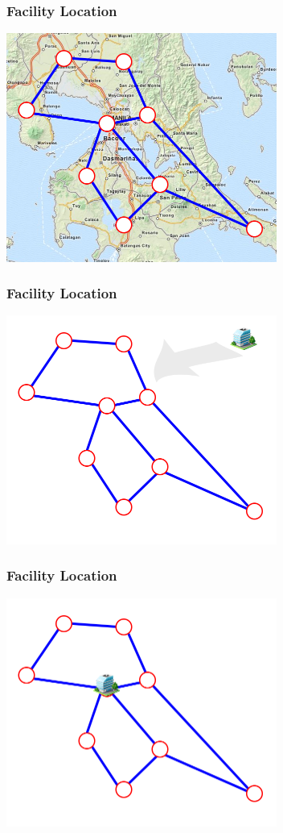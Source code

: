 \documentclass[12pt]{beamer}
\begin{document}
\begin{frame}
\frametitle{Facility Location}
\begin{center}
\includegraphics[height=75mm]{Images/intro2}\\
\end{center}
\end{frame}

\begin{frame}
\frametitle{Facility Location}
\begin{center}
\includegraphics[height=75mm]{Images/intro3}\\
\end{center}
\end{frame}

\begin{frame}
\frametitle{Facility Location}
\begin{center}
\includegraphics[height=75mm]{Images/intro4}\\
\end{center}
\end{frame}
\end{document}
